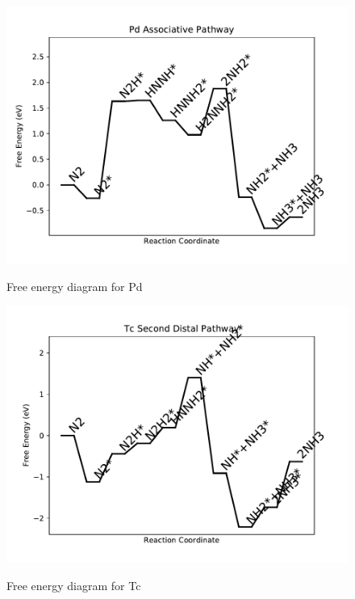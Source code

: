 \documentclass[journal=jacsat,manuscript=article]{achemso}
\begin{document}
\begin{figure}
\includegraphics[width=1\linewidth]{data/plots/Pd_associative.pdf}
\label{fig:Pd_associative}
\caption{Free energy diagram for Pd}
\end{figure}

\newpage
\begin{figure}
\includegraphics[width=1\linewidth]{data/plots/Tc_distal_2.pdf}
\label{fig:Tc_distal_2}
\caption{Free energy diagram for Tc}
\end{figure}
\end{document}
